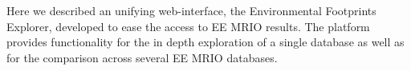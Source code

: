 Here we described an unifying web-interface, the Environmental Footprints Explorer, developed to ease the access to EE MRIO results. The platform provides functionality for the in depth exploration of a single database as well as for the comparison across several EE MRIO databases.